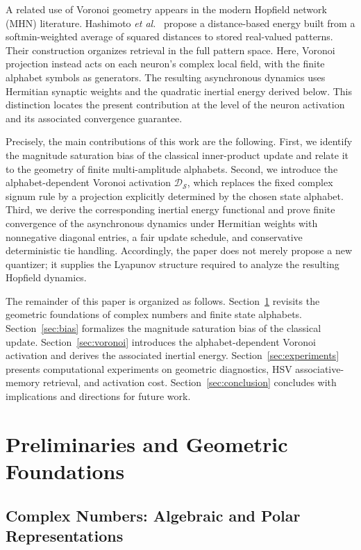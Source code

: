 \documentclass[10pt,journal,letterpaper]{IEEEtran}
\begin{document}
A related use of Voronoi geometry appears in the modern Hopfield network
(MHN) literature. Hashimoto \textit{et al.}~\cite{hashimoto2026voronoi}
propose a distance-based energy built from a softmin-weighted average of
squared distances to stored real-valued patterns. Their construction organizes
retrieval in the full pattern space. Here, Voronoi projection instead acts
on each neuron's complex local field, with the finite alphabet symbols as
generators. The resulting asynchronous dynamics uses Hermitian synaptic
weights and the quadratic inertial energy derived below. This distinction
locates the present contribution at the level of the neuron activation and
its associated convergence guarantee.

Precisely, the main contributions of this work are the following. First, we
identify the magnitude saturation bias of the classical inner-product update
and relate it to the geometry of finite multi-amplitude alphabets. Second, we
introduce the alphabet-dependent Voronoi activation
$\mathcal{D}_{\mathcal{S}}$, which replaces the fixed complex signum rule by a
projection explicitly determined by the chosen state alphabet. Third, we derive
the corresponding inertial energy functional and prove finite convergence of
the asynchronous dynamics under Hermitian weights with nonnegative diagonal
entries, a fair update schedule, and conservative deterministic tie handling.
Accordingly, the paper does not merely propose a new quantizer; it supplies the
Lyapunov structure required to analyze the resulting Hopfield dynamics.

The remainder of this paper is organized as follows. Section~\ref{sec:prelim} revisits the geometric foundations of complex numbers and finite state alphabets. Section~\ref{sec:bias} formalizes the magnitude saturation bias of the classical update. Section~\ref{sec:voronoi} introduces the alphabet-dependent Voronoi activation and derives the associated inertial energy. Section~\ref{sec:experiments} presents computational experiments on geometric diagnostics, HSV associative-memory retrieval, and activation cost. Section~\ref{sec:conclusion} concludes with implications and directions for future work.

\section{Preliminaries and Geometric Foundations}
\label{sec:prelim}

\subsection{Complex Numbers: Algebraic and Polar Representations}
\end{document}
